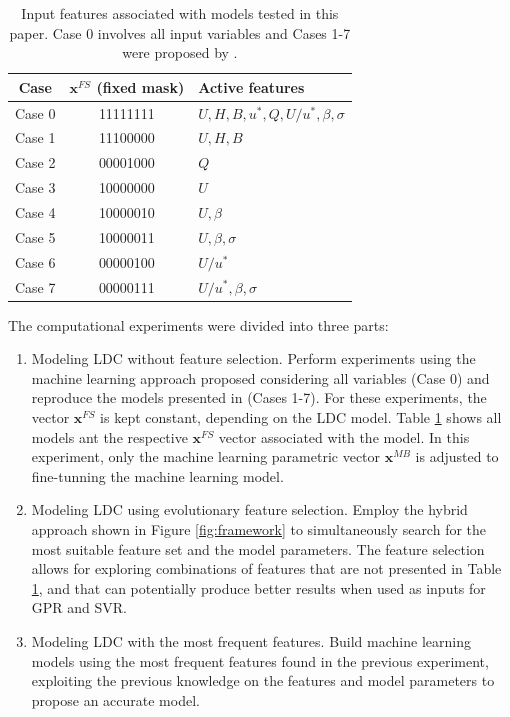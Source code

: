 \documentclass[a4paper,12pt, english]{article}
\newcommand{\x}{\mathbf{x}}
\begin{document}
\begin{table}[!]
    \centering
    \caption{ \label{tab:cases-features} Input features associated with models tested in this paper.
    Case 0 involves all input variables and Cases 1-7 were proposed by \cite{tayfur2005predicting}.
    }
    \begin{tabular}{ccl}
    \hline
      Case   & $\x^{FS}$ (fixed mask) & Active features                         \\ \hline
      Case 0 &  11111111   & $U , H , B, u^*, Q, U/u^*, \beta,\sigma$\\ 
      Case 1 &  11100000   & $U , H , B                             $\\
      Case 2 &  00001000   & $Q                                     $\\
      Case 3 &  10000000   & $U                                     $\\
      Case 4 &  10000010   & $U, \beta                              $\\
      Case 5 &  10000011   & $U, \beta, \sigma                      $\\
      Case 6 &  00000100   & $U/u^*                                 $\\
      Case 7 &  00000111   & $U/u^*, \beta, \sigma                  $\\ \hline
    \end{tabular}
\end{table}


The computational experiments were divided into three parts:
\begin{enumerate}

\item Modeling LDC without feature selection. 
 Perform experiments using the machine learning approach proposed considering all variables (Case 0) and reproduce the models presented in \cite{tayfur2005predicting} (Cases 1-7). 
 For these experiments, the vector $\x^{FS}$ is kept constant, depending on the LDC model. Table \ref{tab:cases-features} shows all models ant the respective $\x^{FS}$ vector associated with the model. In this experiment, only the machine learning parametric vector $\x^{MB}$ is adjusted to fine-tunning the machine learning model.
 
 \item Modeling LDC using evolutionary feature selection. 
 Employ the hybrid approach shown in Figure \ref{fig:framework} to simultaneously search for the most suitable feature set and the model parameters. The feature selection allows for exploring combinations of features that are not presented in Table \ref{tab:cases-features}, and that can potentially produce better results when used as inputs for GPR and SVR. 
 
 \item Modeling LDC with the most frequent features. 
 Build machine learning models using the most frequent features found in the previous experiment, exploiting the previous knowledge on the features and model parameters to propose an accurate model.
 
\end{enumerate}
\end{document}
